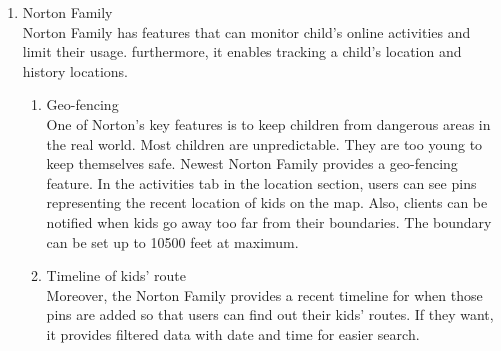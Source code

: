\documentclass[conference]{IEEEtran}
\begin{document}
\begin{enumerate}[label=\arabic*.]
\begin{enumerate}[label=\alph*.]
\begin{enumerate}[label=\roman*.]
        \end{enumerate}
        \item Norton Family \\
        Norton Family has features that can monitor child’s online activities and limit their usage. furthermore, it enables tracking a child’s location and history locations. \\
        \begin{enumerate}[label=\roman*.]
            \item Geo-fencing \\
            One of Norton’s key features is to keep children from dangerous areas in the real world. Most children are unpredictable. They are too young to keep themselves safe. Newest Norton Family provides a geo-fencing feature. In the activities tab in the location section, users can see pins representing the recent location of kids on the map. Also, clients can be notified when kids go away too far from their boundaries. The boundary can be set up to 10500 feet at maximum. \\ 
            \item Timeline of kids’ route \\
            Moreover, the Norton Family provides a recent timeline for when those pins are added so that users can find out their kids’ routes. If they want, it provides filtered data with date and time for easier search. \\
        \end{enumerate}        
    \end{enumerate}
\end{enumerate}
\end{document}
